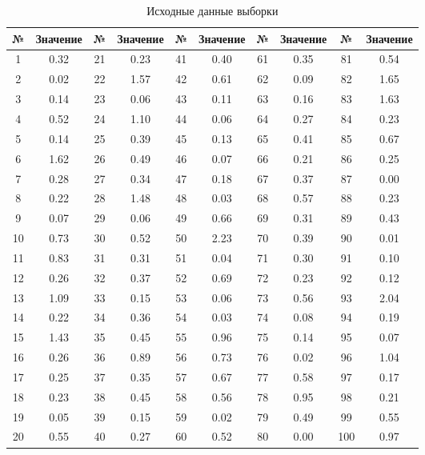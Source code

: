 \begin{table}[h!]
\centering
\begin{tabular}{|c|c||c|c||c|c||c|c||c|c|}
\hline
№ & Значение & № & Значение & № & Значение & № & Значение & № & Значение \\ \hline \hline
1  & 0.32 & 21 & 0.23 & 41 & 0.40 & 61 & 0.35 & 81 & 0.54 \\ \hline
2  & 0.02 & 22 & 1.57 & 42 & 0.61 & 62 & 0.09 & 82 & 1.65 \\ \hline
3  & 0.14 & 23 & 0.06 & 43 & 0.11 & 63 & 0.16 & 83 & 1.63 \\ \hline
4  & 0.52 & 24 & 1.10 & 44 & 0.06 & 64 & 0.27 & 84 & 0.23 \\ \hline
5  & 0.14 & 25 & 0.39 & 45 & 0.13 & 65 & 0.41 & 85 & 0.67 \\ \hline
6  & 1.62 & 26 & 0.49 & 46 & 0.07 & 66 & 0.21 & 86 & 0.25 \\ \hline
7  & 0.28 & 27 & 0.34 & 47 & 0.18 & 67 & 0.37 & 87 & 0.00 \\ \hline
8  & 0.22 & 28 & 1.48 & 48 & 0.03 & 68 & 0.57 & 88 & 0.23 \\ \hline
9  & 0.07 & 29 & 0.06 & 49 & 0.66 & 69 & 0.31 & 89 & 0.43 \\ \hline
10 & 0.73 & 30 & 0.52 & 50 & 2.23 & 70 & 0.39 & 90 & 0.01 \\ \hline
11 & 0.83 & 31 & 0.31 & 51 & 0.04 & 71 & 0.30 & 91 & 0.10 \\ \hline
12 & 0.26 & 32 & 0.37 & 52 & 0.69 & 72 & 0.23 & 92 & 0.12 \\ \hline
13 & 1.09 & 33 & 0.15 & 53 & 0.06 & 73 & 0.56 & 93 & 2.04 \\ \hline
14 & 0.22 & 34 & 0.36 & 54 & 0.03 & 74 & 0.08 & 94 & 0.19 \\ \hline
15 & 1.43 & 35 & 0.45 & 55 & 0.96 & 75 & 0.14 & 95 & 0.07 \\ \hline
16 & 0.26 & 36 & 0.89 & 56 & 0.73 & 76 & 0.02 & 96 & 1.04 \\ \hline
17 & 0.25 & 37 & 0.35 & 57 & 0.67 & 77 & 0.58 & 97 & 0.17 \\ \hline
18 & 0.23 & 38 & 0.45 & 58 & 0.56 & 78 & 0.95 & 98 & 0.21 \\ \hline
19 & 0.05 & 39 & 0.15 & 59 & 0.02 & 79 & 0.49 & 99 & 0.55 \\ \hline
20 & 0.55 & 40 & 0.27 & 60 & 0.52 & 80 & 0.00 & 100& 0.97 \\ \hline
\end{tabular}
\caption{Исходные данные выборки}
\end{table}